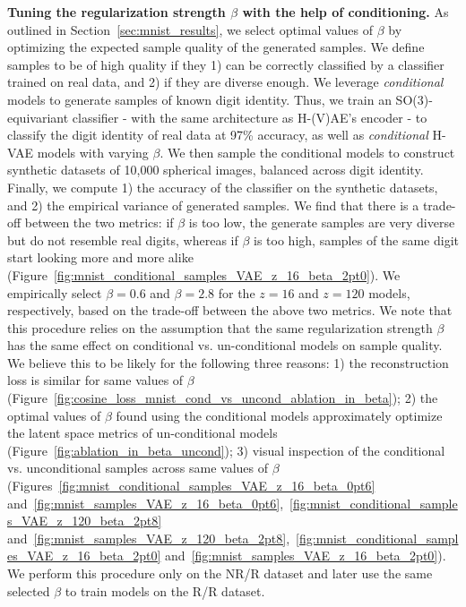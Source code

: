 \textbf{Tuning the regularization strength $\beta$ with the help of conditioning.}
As outlined in Section~\ref{sec:mnist_results}, we select optimal values of $\beta$ by optimizing
the expected sample quality of the generated samples. We define samples to be of high quality if
they 1) can be correctly classified by a classifier trained on real data, and 2) if they are
diverse enough. We leverage \textit{conditional} models to generate samples of known digit
identity. Thus, we train an SO(3)-equivariant classifier - with the same architecture as H-(V)AE's
encoder - to classify the digit identity of real data at 97\% accuracy, as well as
\textit{conditional} H-VAE models with varying $\beta$. We then sample the conditional models to
construct synthetic datasets of 10,000 spherical images, balanced across digit identity. Finally,
we compute 1) the accuracy of the classifier on the synthetic datasets, and 2) the empirical
variance of generated samples. We find that there is a trade-off between the two metrics: if
$\beta$ is too low, the generate samples are very diverse but do not resemble real digits, whereas
if $\beta$ is too high, samples of the same digit start looking more and more alike
(Figure~\ref{fig:mnist_conditional_samples_VAE_z_16_beta_2pt0}). We empirically select $\beta =
0.6$ and $\beta = 2.8$ for the $z = 16$ and $z = 120$ models, respectively, based on the trade-off
between the above two metrics.
We note that this procedure relies on the assumption that the same regularization strength $\beta$
has the same effect on conditional vs. un-conditional models on sample quality. We believe this to
be likely for the following three reasons: 1) the reconstruction loss is similar for same values of
$\beta$ (Figure~\ref{fig:cosine_loss_mnist_cond_vs_uncond_ablation_in_beta}); 2) the optimal values
of $\beta$ found using the conditional models approximately optimize the latent space metrics of
un-conditional models (Figure~\ref{fig:ablation_in_beta_uncond}); 3) visual inspection of the
conditional vs. unconditional samples across same values of $\beta$
(Figures~\ref{fig:mnist_conditional_samples_VAE_z_16_beta_0pt6}
and~\ref{fig:mnist_samples_VAE_z_16_beta_0pt6},~\ref{fig:mnist_conditional_samples_VAE_z_120_beta_2pt8} and~\ref{fig:mnist_samples_VAE_z_120_beta_2pt8},~\ref{fig:mnist_conditional_samples_VAE_z_16_beta_2pt0} and~\ref{fig:mnist_samples_VAE_z_16_beta_2pt0}).
We perform this procedure only on the NR/R dataset and later use the same selected $\beta$ to train
models on the R/R dataset.


